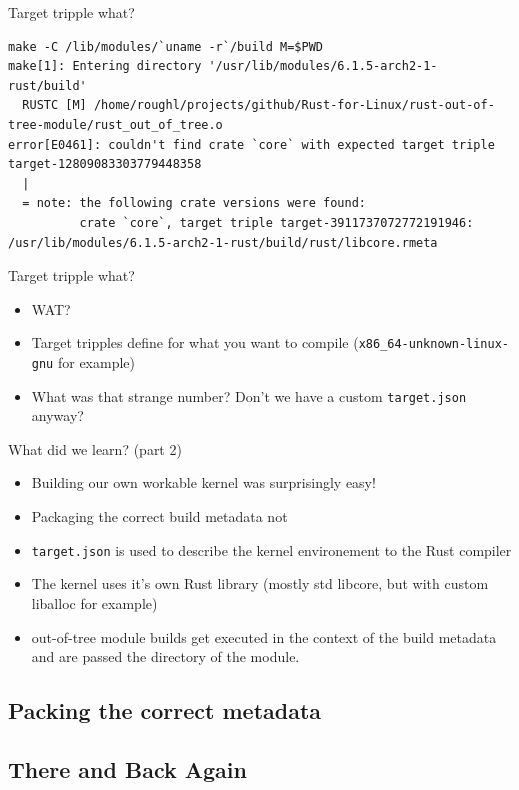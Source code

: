 \begin{frame}[c,fragile]{Target tripple what?}
  \begin{verbatim}
make -C /lib/modules/`uname -r`/build M=$PWD
make[1]: Entering directory '/usr/lib/modules/6.1.5-arch2-1-rust/build'
  RUSTC [M] /home/roughl/projects/github/Rust-for-Linux/rust-out-of-tree-module/rust_out_of_tree.o
error[E0461]: couldn't find crate `core` with expected target triple target-12809083303779448358
  |
  = note: the following crate versions were found:
          crate `core`, target triple target-3911737072772191946: /usr/lib/modules/6.1.5-arch2-1-rust/build/rust/libcore.rmeta
  \end{verbatim}
\end{frame}

\begin{frame}[c,fragile]{Target tripple what?}
  \begin{itemize}
    \item WAT?
    \item Target tripples define for what you want to compile
      (\texttt{x86\_64-unknown-linux-gnu} for example)
    \item What was that strange number? Don't we have a custom
      \texttt{target.json} anyway?
  \end{itemize}
\end{frame}

\begin{frame}[c]{What did we learn? (part 2)}
  \small
  \begin{itemize}
    \item Building our own workable kernel was surprisingly easy!
    \item Packaging the correct build metadata not
    \item \texttt{target.json} is used to describe the kernel environement to
      the Rust compiler
    \item The kernel uses it's own Rust library (mostly std libcore, but with
      custom liballoc for example)
    \item out-of-tree module builds get executed in the context of the build
      metadata and are passed the directory of the module.
  \end{itemize}
\end{frame}

\subsection{Packing the correct metadata}

\subsection{There and Back Again}
